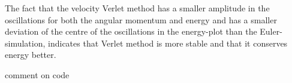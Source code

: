 The fact that the velocity Verlet method has a smaller amplitude in the oscillations for both the angular momentum and energy and has a smaller deviation of the centre of the oscillations in the energy-plot than the Euler-simulation, indicates that Verlet method is more stable and that it conserves energy better. 

comment on code